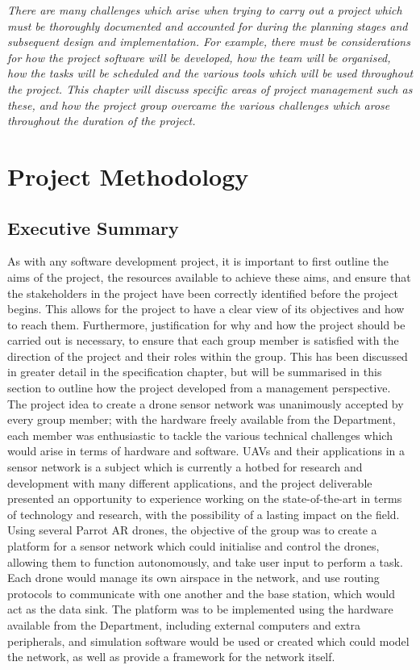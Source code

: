 \emph{There are many challenges which arise when trying to carry out a project which must be thoroughly documented and accounted for during the planning stages and subsequent design and implementation. For example, there must be considerations for how the project software will be developed, how the team will be organised, how the tasks will be scheduled and the various tools which will be used throughout the project. This chapter will discuss specific areas of project management such as these, and how the project group overcame the various challenges which arose throughout the duration of the project.}
	\section{Project Methodology}
		\subsection{Executive Summary}
As with any software development project, it is important to first outline the aims of the project, the resources available to achieve these aims, and ensure that the stakeholders in the project have been correctly identified before the project begins. This allows for the project to have a clear view of its objectives and how to reach them. Furthermore, justification for why and how the project should be carried out is necessary, to ensure that each group member is satisfied with the direction of the project and their roles within the group. This has been discussed in greater detail in the specification chapter, but will be summarised in this section to outline how the project developed from a management perspective.
The project idea to create a drone sensor network was unanimously accepted by every group member; with the hardware freely available from the Department, each member was enthusiastic to tackle the various technical challenges which would arise in terms of hardware and software. UAVs and their applications in a sensor network is a subject which is currently a hotbed for research and development with many different applications, and the project deliverable presented an opportunity to experience working on the state-of-the-art in terms of technology and research, with the possibility of a lasting impact on the field.
Using several Parrot AR drones, the objective of the group was to create a platform for a sensor network which could initialise and control the drones, allowing them to function autonomously, and take user input to perform a task. Each drone would manage its own airspace in the network, and use routing protocols to communicate with one another and the base station, which would act as the data sink. The platform was to be implemented using the hardware available from the Department, including external computers and extra peripherals, and simulation software would be used or created which could model the network, as well as provide a framework for the network itself.
